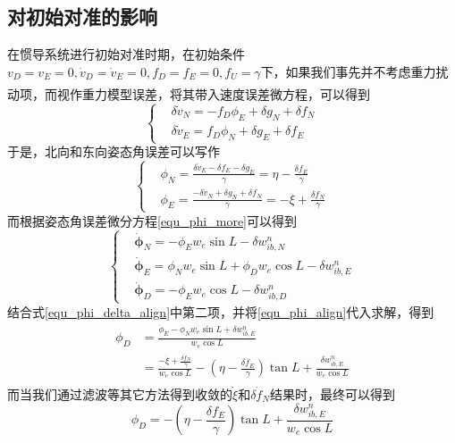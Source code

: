 \documentclass[12pt,a4,utf8]{article}
\newcommand{\upcite}[1]{\textsuperscript{\textsuperscript{\cite{#1}}}} %
\begin{document}
\subsection{对初始对准的影响}
在惯导系统进行初始对准时期，在初始条件$v_D =v_E=0, \dot{v}_D=\dot{v}_E = 0, f_D = f_E = 0, f_U = \gamma$下，如果我们事先并不考虑重力扰动项\upcite{LUOKAIXIN2023}，而视作重力模型误差，将其带入速度误差微方程，可以得到
\begin{equation}
      \left\{ \begin{aligned}
            &\delta \dot{v}_N = -f_D\phi_E + \delta g_N + \delta f_N
            \\
            &\delta \dot{v}_E = f_D\phi_N + \delta g_E + \delta f_E
      \end{aligned} \right.
\end{equation}
于是，北向和东向姿态角误差可以写作
\begin{equation}
      \left\{ \begin{aligned}
            &\phi_N = \frac{\delta \dot{v}_E - \delta f_E - \delta g_E}{\gamma} =  \eta - \frac{\delta f_E}{\gamma}
            \\
            &\phi_E = \frac{-\delta \dot{v}_N + \delta g_N + \delta f_N}{\gamma} = -\xi + \frac{\delta f_N}{\gamma}
      \end{aligned} \right.
      \label{equ_phi_align}
\end{equation}
而根据姿态角误差微分方程\ref{equ_phi_more}可以得到
\begin{equation}
      \left\{ \begin{aligned}
      & \dot{\bm{\phi}}_N=-\phi_E w_e\sin L - \delta w^n_{ib,N} 
      \\ 
      & \dot{\bm{\phi}}_E= \phi_N w_e \sin L + \phi_D w_e \cos L - \delta w^n_{ib,E}
      \\ 
      & \dot{\bm{\phi}}_D = -\phi_E w_e \cos L - \delta w^n_{ib,D}
\end{aligned} \right.
\label{equ_phi_delta_align}
\end{equation}
结合式\ref{equ_phi_delta_align}中第二项，并将\ref{equ_phi_align}代入求解，得到
\begin{equation}
      \begin{aligned}
      \phi_D &= \frac{\dot{\phi}_E - \phi_N w_e \sin L +\delta w^n_{ib,E}}{w_e\cos L}
      \\
      &= \frac{-\dot{\xi} + \frac{\delta \dot{f}_N}{\gamma}}{w_e\cos L} - (\eta - \frac{\delta f_E}{\gamma})\tan L + \frac{\delta w^n_{ib,E}}{w_e\cos L}
      \end{aligned}
\end{equation}
而当我们通过滤波等其它方法得到收敛的$\dot{\xi}$和$ \delta \dot{f}_N$结果时\upcite{soler2014deflection}，最终可以得到
\begin{equation}
      \phi_D = -(\eta - \frac{\delta f_E}{\gamma})\tan L + \frac{\delta w^n_{ib,E}}{w_e\cos L}
\end{equation}
\end{document}
